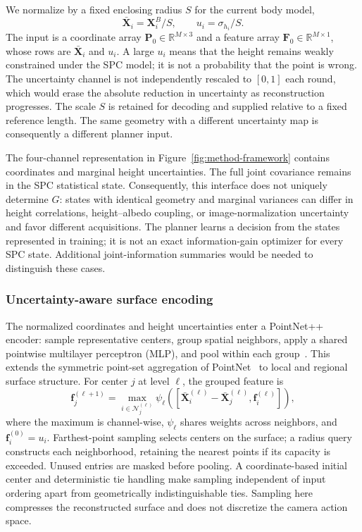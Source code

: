 We normalize by a fixed enclosing radius $S$ for the current body model,
\begin{equation}
    \bar{\mathbf X}_i=\mathbf X_i^B/S,
    \qquad u_i=\sigma_{h_i}/S.
    \label{eq:planner-input-normalization}
\end{equation}
The input is a coordinate array $\mathbf P_0\in\mathbb R^{M\times3}$ and a feature array $\mathbf F_0\in\mathbb R^{M\times1}$, whose rows are $\bar{\mathbf X}_i$ and $u_i$. A large $u_i$ means that the height remains weakly constrained under the SPC model; it is not a probability that the point is wrong. The uncertainty channel is not independently rescaled to $[0,1]$ each round, which would erase the absolute reduction in uncertainty as reconstruction progresses. The scale $S$ is retained for decoding and supplied relative to a fixed reference length. The same geometry with a different uncertainty map is consequently a different planner input.

The four-channel representation in Figure~\ref{fig:method-framework} contains coordinates and marginal height uncertainties. The full joint covariance remains in the SPC statistical state. Consequently, this interface does not uniquely determine $G$: states with identical geometry and marginal variances can differ in height correlations, height--albedo coupling, or image-normalization uncertainty and favor different acquisitions. The planner learns a decision from the states represented in training; it is not an exact information-gain optimizer for every SPC state. Additional joint-information summaries would be needed to distinguish these cases.

\subsubsection{Uncertainty-aware surface encoding}
\label{subsubsec:planner-encoder}

The normalized coordinates and height uncertainties enter a PointNet++ encoder: sample representative centers, group spatial neighbors, apply a shared pointwise multilayer perceptron (MLP), and pool within each group~\citep{qi2017pointnetpp}. This extends the symmetric point-set aggregation of PointNet~\citep{qi2017pointnet} to local and regional surface structure. For center $j$ at level $\ell$, the grouped feature is
\begin{equation}
    \mathbf f_j^{(\ell+1)}=\max_{i\in\mathcal N_j^{(\ell)}}
    \psi_\ell\!\left(
    [\bar{\mathbf X}_i^{(\ell)}-\bar{\mathbf X}_j^{(\ell)},
      \mathbf f_i^{(\ell)}]\right),
    \label{eq:planner-set-abstraction}
\end{equation}
where the maximum is channel-wise, $\psi_\ell$ shares weights across neighbors, and $\mathbf f_i^{(0)}=u_i$. Farthest-point sampling selects centers on the surface; a radius query constructs each neighborhood, retaining the nearest points if its capacity is exceeded. Unused entries are masked before pooling. A coordinate-based initial center and deterministic tie handling make sampling independent of input ordering apart from geometrically indistinguishable ties. Sampling here compresses the reconstructed surface and does not discretize the camera action space.

